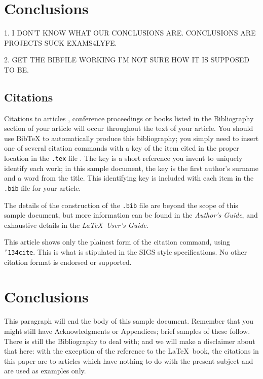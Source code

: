 \documentclass{sig-alternate}
\begin{document}
\section{Conclusions}
1. I DON'T KNOW WHAT OUR CONCLUSIONS ARE. CONCLUSIONS ARE PROJECTS SUCK EXAMS4LYFE.

2. GET THE BIBFILE WORKING I'M NOT SURE HOW IT IS SUPPOSED TO BE.

\subsection{Citations}
Citations to articles \cite{bowman:reasoning,
clark:pct, braams:babel, herlihy:methodology},
conference proceedings \cite{clark:pct} or
books \cite{salas:calculus, Lamport:LaTeX} listed
in the Bibliography section of your
article will occur throughout the text of your article.
You should use BibTeX to automatically produce this bibliography;
you simply need to insert one of several citation commands with
a key of the item cited in the proper location in
the \texttt{.tex} file \cite{Lamport:LaTeX}.
The key is a short reference you invent to uniquely
identify each work; in this sample document, the key is
the first author's surname and a
word from the title.  This identifying key is included
with each item in the \texttt{.bib} file for your article.

The details of the construction of the \texttt{.bib} file
are beyond the scope of this sample document, but more
information can be found in the \textit{Author's Guide},
and exhaustive details in the \textit{\LaTeX\ User's
Guide}\cite{Lamport:LaTeX}.

This article shows only the plainest form
of the citation command, using \texttt{{\char'134}cite}.
This is what is stipulated in the SIGS style specifications.
No other citation format is endorsed or supported.

\section{Conclusions}
This paragraph will end the body of this sample document.
Remember that you might still have Acknowledgments or
Appendices; brief samples of these
follow.  There is still the Bibliography to deal with; and
we will make a disclaimer about that here: with the exception
of the reference to the \LaTeX\ book, the citations in
this paper are to articles which have nothing to
do with the present subject and are used as
examples only.


%

\end{document}
